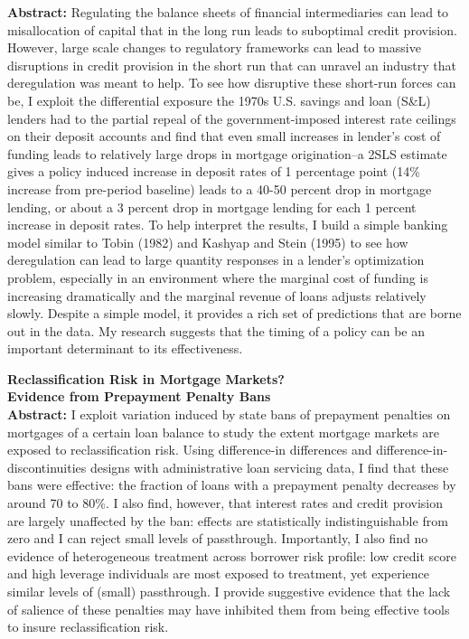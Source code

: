 \documentclass[10pt]{article}
\renewcommand{\section}[2]%
        {\pagebreak[2]\vspace{1.3\baselineskip}%
         \phantomsection\addcontentsline{toc}{section}{#1}%
         \hspace{0in}%
         \marginpar{
         \raggedright \scshape #1}#2}
\begin{document}
\textbf{Abstract:} Regulating the balance sheets of financial intermediaries can lead to misallocation of capital that in the long run leads to suboptimal credit provision. However, large scale changes to regulatory frameworks can lead to massive disruptions in credit provision in the short run that can unravel an industry that deregulation was meant to help. To see how disruptive these short-run forces can be, I exploit the differential exposure the 1970s U.S. savings and loan (S\&L) lenders had to the partial repeal of the government-imposed interest rate ceilings on their deposit accounts and find that even small increases in lender's cost of funding leads to relatively large drops in mortgage origination--a 2SLS estimate gives a policy induced increase in deposit rates of 1 percentage point (14\% increase from pre-period baseline) leads to a 40-50 percent drop in mortgage lending, or about a 3 percent drop in mortgage lending for each 1 percent increase in deposit rates. To help interpret the results, I build a simple banking model similar to Tobin (1982) and Kashyap and Stein (1995) to see how deregulation can lead to large quantity responses in a lender's optimization problem, especially in an environment where the marginal cost of funding is increasing dramatically and the marginal revenue of loans adjusts relatively slowly. Despite a simple model, it provides a rich set of predictions that are borne out in the data. My research suggests that the timing of a policy can be an important determinant to its effectiveness.

\section{Works in Progress}  \textbf{Reclassification Risk in Mortgage Markets? \\
Evidence from Prepayment Penalty Bans} \\

\textbf{Abstract:} I exploit variation induced by state bans of prepayment penalties on mortgages of a certain loan balance to study the extent mortgage markets are exposed to reclassification risk. Using difference-in differences and difference-in-discontinuities designs with administrative loan servicing data, I find that these bans were effective: the fraction of loans with a prepayment penalty decreases by around 70 to 80\%. I also find, however, that interest rates and credit provision are largely unaffected by the ban: effects are statistically indistinguishable from zero and I can reject small levels of passthrough. Importantly, I also find no evidence of heterogeneous treatment across borrower risk profile: low credit score and high leverage individuals are most exposed to treatment, yet experience similar levels of (small) passthrough. I provide suggestive evidence that the lack of salience of these penalties may have inhibited them from being effective tools to insure reclassification risk. \\
\end{document}
